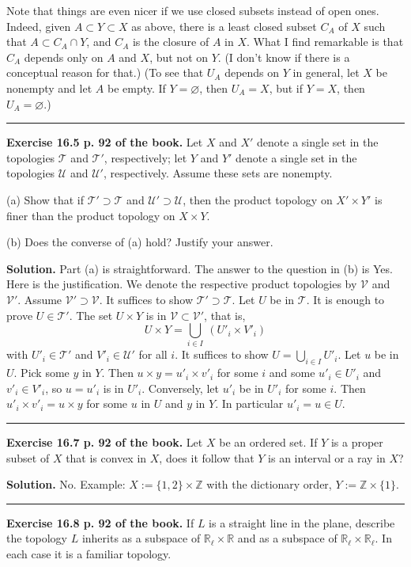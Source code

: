 \documentclass[12pt,letterpaper]{article}
\newcommand{\hs}{\bigskip\hrule\medskip}
\newcommand{\mc}{\mathcal}
\newcommand{\noi}{\noindent}%
\newcommand{\R}{\mathbb R}
\newcommand{\Z}{\mathbb Z}
\begin{document}
Note that things are even nicer if we use closed subsets instead of open ones. Indeed, given $A\subset Y\subset X$ as above, there is a least closed subset $C_A$ of $X$ such that $A\subset C_A\cap Y$, and $C_A$ is the closure of $A$ in $X$. What I find remarkable is that $C_A$ depends only on $A$ and $X$, but not on $Y$. (I don't know if there is a conceptual reason for that.) (To see that $U_A$ depends on $Y$ in general, let $X$ be nonempty and let $A$ be empty. If $Y=\varnothing$, then $U_A=X$, but if $Y=X$, then $U_A=\varnothing$.) \bigskip 

\hrule\medskip

\noi\textbf{Exercise 16.5 p. 92 of the book.} Let $X$ and $X'$ denote a single set in the topologies $\mc T$ and $\mc T'$, respectively; let $Y$ and $Y'$ denote a single set in the topologies $\mc U$ and $\mc U'$, respectively. Assume these sets are nonempty.

\noi(a) Show that if $\mc T'\supset\mc T$ and $\mc U'\supset\mc U$, then the product topology on $X'\times Y'$ is finer than the product topology on $X\times Y$.

\noi(b) Does the converse of (a) hold? Justify your answer.

\noi\textbf{Solution.} Part (a) is straightforward. The answer to the question in (b) is Yes. Here is the justification. We denote the respective product topologies by $\mc V$ and $\mc V'$.  Assume $\mc V'\supset\mc V$. It suffices to show $\mc T'\supset\mc T$. Let $U$ be in $\mc T$. It is enough to prove $U\in\mc T'$. The set $U\times Y$ is in $\mc V\subset\mc V'$, that is, 
$$
U\times Y=\bigcup_{i\in I}\ (U'_i\times V'_i)
$$ 
with $U'_i\in\mc T'$ and $V'_i\in\mc U'$ for all $i$. It suffices to show $U=\bigcup_{i\in I}U'_i$. Let $u$ be in $U$. Pick some $y$ in $Y$. Then $u\times y=u'_i\times v'_i$ for some $i$ and some $u'_i\in U'_i$ and $v'_i\in V'_i$, so $u=u'_i$ is in $U'_i$. Conversely, let $u'_i$ be in $U'_i$ for some $i$. Then $u'_i\times v'_i=u\times y$ for some $u$ in $U$ and $y$ in $Y$. In particular $u'_i=u\in U$. 

\hs

\noi\textbf{Exercise 16.7 p. 92 of the book.} Let $X$ be an ordered set. If $Y$ is a proper subset of $X$ that is convex in $X$, does it follow that $Y$ is an interval or a ray in $X$? 

\noi\textbf{Solution.} No. Example: $X:=\{1,2\}\times\Z$ with the dictionary order, $Y:=\Z\times\{1\}$. 

\hs

\noi\textbf{Exercise 16.8 p. 92 of the book.} If $L$ is a straight line in the plane, describe the topology $L$ inherits as a subspace of $\R_\ell\times\R$ and as a subspace of $\R_\ell\times\R_\ell$. In each case it is a familiar topology. 
\end{document}
